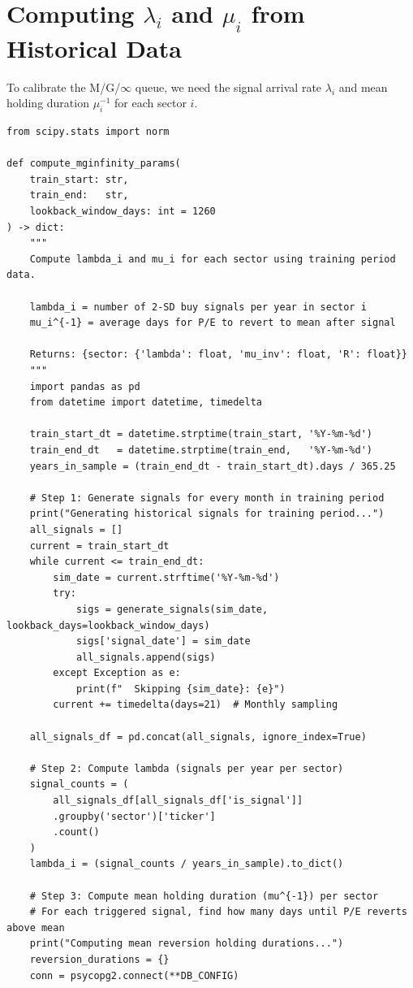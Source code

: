 \documentclass[11pt, oneside]{book}
\begin{document}
\section{Computing $\lambda_i$ and $\mu_i$ from Historical Data}

To calibrate the M/G/$\infty$ queue, we need the signal arrival rate $\lambda_i$ and mean holding duration $\mu_i^{-1}$ for each sector $i$.

\begin{lstlisting}[style=pythonstyle, caption={M/G/Infinity Parameter Extraction}]
from scipy.stats import norm

def compute_mginfinity_params(
    train_start: str,
    train_end:   str,
    lookback_window_days: int = 1260
) -> dict:
    """
    Compute lambda_i and mu_i for each sector using training period data.

    lambda_i = number of 2-SD buy signals per year in sector i
    mu_i^{-1} = average days for P/E to revert to mean after signal

    Returns: {sector: {'lambda': float, 'mu_inv': float, 'R': float}}
    """
    import pandas as pd
    from datetime import datetime, timedelta

    train_start_dt = datetime.strptime(train_start, '%Y-%m-%d')
    train_end_dt   = datetime.strptime(train_end,   '%Y-%m-%d')
    years_in_sample = (train_end_dt - train_start_dt).days / 365.25

    # Step 1: Generate signals for every month in training period
    print("Generating historical signals for training period...")
    all_signals = []
    current = train_start_dt
    while current <= train_end_dt:
        sim_date = current.strftime('%Y-%m-%d')
        try:
            sigs = generate_signals(sim_date, lookback_days=lookback_window_days)
            sigs['signal_date'] = sim_date
            all_signals.append(sigs)
        except Exception as e:
            print(f"  Skipping {sim_date}: {e}")
        current += timedelta(days=21)  # Monthly sampling

    all_signals_df = pd.concat(all_signals, ignore_index=True)

    # Step 2: Compute lambda (signals per year per sector)
    signal_counts = (
        all_signals_df[all_signals_df['is_signal']]
        .groupby('sector')['ticker']
        .count()
    )
    lambda_i = (signal_counts / years_in_sample).to_dict()

    # Step 3: Compute mean holding duration (mu^{-1}) per sector
    # For each triggered signal, find how many days until P/E reverts above mean
    print("Computing mean reversion holding durations...")
    reversion_durations = {}
    conn = psycopg2.connect(**DB_CONFIG)


\end{lstlisting}
\end{document}
